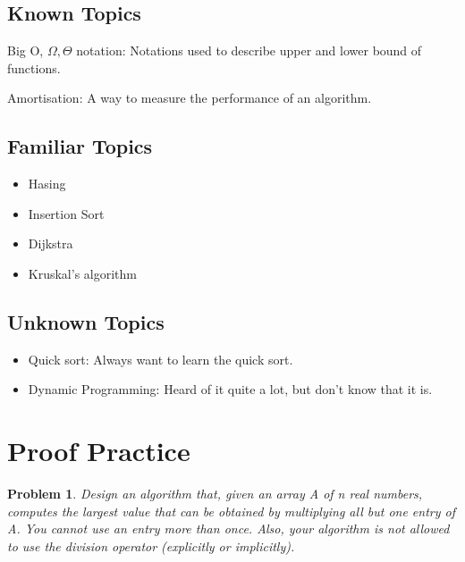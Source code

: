 \documentclass[12pt]{article}
\newtheorem{problem}{Problem}
\begin{document}
\subsection{Known Topics}
\begin{description}
 \item Big O, $\Omega, \Theta$ notation: Notations used to describe upper and lower bound of functions. 
 \item Amortisation: A way to measure the performance of an algorithm.  
\end{description}


\subsection{Familiar Topics}
\begin{itemize}
 \item  Hasing
 \item  Insertion Sort
 \item Dijkstra
 \item Kruskal's algorithm
\end{itemize}

\subsection{Unknown Topics}
\begin{itemize}
 \item  Quick sort: Always want to learn the quick sort.
 \item  Dynamic Programming: Heard of it quite a lot, but don't know that it is.
\end{itemize}
\pagebreak

\section{Proof Practice}
\begin{problem}
Design an algorithm that, given an array A of n real numbers, computes the largest value that can be obtained by multiplying all but one entry of A. You cannot use an entry more than once. Also, your algorithm is not allowed to use the division operator (explicitly or implicitly).
\end{problem}
\end{document}
